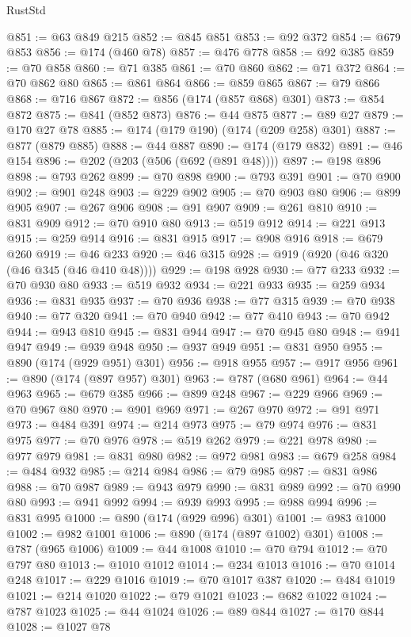 \begin{lexlean}{RustStd}
\begin{coremodule}
@851 := @63 @849 @215
@852 := @845 @851
@853 := @92 @372
@854 := @679 @853
@856 := @174 (@460 @78)
@857 := @476 @778
@858 := @92 @385
@859 := @70 @858
@860 := @71 @385
@861 := @70 @860
@862 := @71 @372
@864 := @70 @862 @80
@865 := @861 @864
@866 := @859 @865
@867 := @79 @866
@868 := @716 @867
@872 := @856 (@174 (@857 @868) @301)
@873 := @854 @872
@875 := @841 (@852 @873)
@876 := @44 @875
@877 := @89 @27
@879 := @170 @27 @78
@885 := @174 (@179 @190) (@174 (@209 @258) @301)
@887 := @877 (@879 @885)
@888 := @44 @887
@890 := @174 (@179 @832)
@891 := @46 @154
@896 := @202 (@203 (@506 (@692 (@891 @48))))
@897 := @198 @896
@898 := @793 @262
@899 := @70 @898
@900 := @793 @391
@901 := @70 @900
@902 := @901 @248
@903 := @229 @902
@905 := @70 @903 @80
@906 := @899 @905
@907 := @267 @906
@908 := @91 @907
@909 := @261 @810
@910 := @831 @909
@912 := @70 @910 @80
@913 := @519 @912
@914 := @221 @913
@915 := @259 @914
@916 := @831 @915
@917 := @908 @916
@918 := @679 @260
@919 := @46 @233
@920 := @46 @315
@928 := @919 (@920 (@46 @320 (@46 @345 (@46 @410 @48))))
@929 := @198 @928
@930 := @77 @233
@932 := @70 @930 @80
@933 := @519 @932
@934 := @221 @933
@935 := @259 @934
@936 := @831 @935
@937 := @70 @936
@938 := @77 @315
@939 := @70 @938
@940 := @77 @320
@941 := @70 @940
@942 := @77 @410
@943 := @70 @942
@944 := @943 @810
@945 := @831 @944
@947 := @70 @945 @80
@948 := @941 @947
@949 := @939 @948
@950 := @937 @949
@951 := @831 @950
@955 := @890 (@174 (@929 @951) @301)
@956 := @918 @955
@957 := @917 @956
@961 := @890 (@174 (@897 @957) @301)
@963 := @787 (@680 @961)
@964 := @44 @963
@965 := @679 @385
@966 := @899 @248
@967 := @229 @966
@969 := @70 @967 @80
@970 := @901 @969
@971 := @267 @970
@972 := @91 @971
@973 := @484 @391
@974 := @214 @973
@975 := @79 @974
@976 := @831 @975
@977 := @70 @976
@978 := @519 @262
@979 := @221 @978
@980 := @977 @979
@981 := @831 @980
@982 := @972 @981
@983 := @679 @258
@984 := @484 @932
@985 := @214 @984
@986 := @79 @985
@987 := @831 @986
@988 := @70 @987
@989 := @943 @979
@990 := @831 @989
@992 := @70 @990 @80
@993 := @941 @992
@994 := @939 @993
@995 := @988 @994
@996 := @831 @995
@1000 := @890 (@174 (@929 @996) @301)
@1001 := @983 @1000
@1002 := @982 @1001
@1006 := @890 (@174 (@897 @1002) @301)
@1008 := @787 (@965 @1006)
@1009 := @44 @1008
@1010 := @70 @794
@1012 := @70 @797 @80
@1013 := @1010 @1012
@1014 := @234 @1013
@1016 := @70 @1014 @248
@1017 := @229 @1016
@1019 := @70 @1017 @387
@1020 := @484 @1019
@1021 := @214 @1020
@1022 := @79 @1021
@1023 := @682 @1022
@1024 := @787 @1023
@1025 := @44 @1024
@1026 := @89 @844
@1027 := @170 @844
@1028 := @1027 @78

\end{coremodule}
\end{lexlean}

